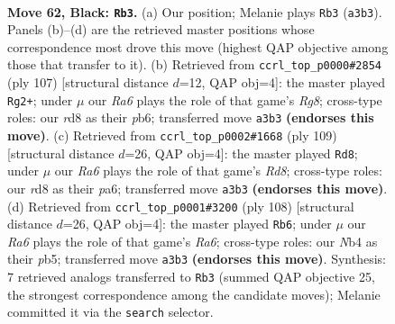 \documentclass[11pt]{article}
\begin{document}
\clearpage

\begin{figure}[p]\centering
\begin{subfigure}{0.46\textwidth}\centering
\resizebox{\linewidth}{!}{%
\newchessgame
\chessboard[
  setfen={3R4/kp5p/6pP/p4p2/1n3P2/r7/6K1/4R3 b - - 12 62},
  showmover=false,
  pgfstyle=straightmove, color=movearrow, markmove={a3-b3}
]}
\caption{}
\end{subfigure}\hfill
\begin{subfigure}{0.46\textwidth}\centering
\resizebox{\linewidth}{!}{%
\newchessgame
\chessboard[
  setfen={8/7R/1P1kp1p1/p4p2/P7/2P5/K7/6r1 b - - 12 54},
  showmover=false,
  pgfstyle=straightmove, color=movearrow, markmove={g1-g2}
]}
\caption{}
\end{subfigure}
\\[4pt]
\begin{subfigure}{0.46\textwidth}\centering
\resizebox{\linewidth}{!}{%
\newchessgame
\chessboard[
  setfen={8/5p2/Pp4p1/2k1p1P1/4P3/2K5/R7/3r4 b - - 0 55},
  showmover=false,
  pgfstyle=straightmove, color=movearrow, markmove={d1-d8}
]}
\caption{}
\end{subfigure}\hfill
\begin{subfigure}{0.46\textwidth}\centering
\resizebox{\linewidth}{!}{%
\newchessgame
\chessboard[
  setfen={8/6k1/R7/1p3p1p/5P1P/P5PK/2r5/8 w - - 4 55},
  showmover=false,
  pgfstyle=straightmove, color=movearrow, markmove={a6-b6}
]}
\caption{}
\end{subfigure}
\caption{\textbf{Move 62, Black: \texttt{Rb3}.} (a) Our position; Melanie plays \texttt{Rb3} (\texttt{a3b3}). Panels (b)--(d) are the retrieved master positions whose correspondence most drove this move (highest QAP objective among those that transfer to it). (b) Retrieved from \texttt{ccrl\_top\_p0000\#2854} (ply 107) [structural distance $d$=12, QAP obj=4]: the master played \texttt{Rg2+}; under $\mu$ our \emph{Ra6} plays the role of that game's \emph{Rg8}; cross-type roles: our \emph{r}d8 as their \emph{p}b6; transferred move \texttt{a3b3} \textbf{(endorses this move)}. (c) Retrieved from \texttt{ccrl\_top\_p0002\#1668} (ply 109) [structural distance $d$=26, QAP obj=4]: the master played \texttt{Rd8}; under $\mu$ our \emph{Ra6} plays the role of that game's \emph{Rd8}; cross-type roles: our \emph{r}d8 as their \emph{p}a6; transferred move \texttt{a3b3} \textbf{(endorses this move)}. (d) Retrieved from \texttt{ccrl\_top\_p0001\#3200} (ply 108) [structural distance $d$=26, QAP obj=4]: the master played \texttt{Rb6}; under $\mu$ our \emph{Ra6} plays the role of that game's \emph{Ra6}; cross-type roles: our \emph{N}b4 as their \emph{p}b5; transferred move \texttt{a3b3} \textbf{(endorses this move)}. Synthesis: 7 retrieved analogs transferred to \texttt{Rb3} (summed QAP objective 25, the strongest correspondence among the candidate moves); Melanie committed it via the \texttt{search} selector.}
\label{fig:thought-m123}
\end{figure}
\end{document}
